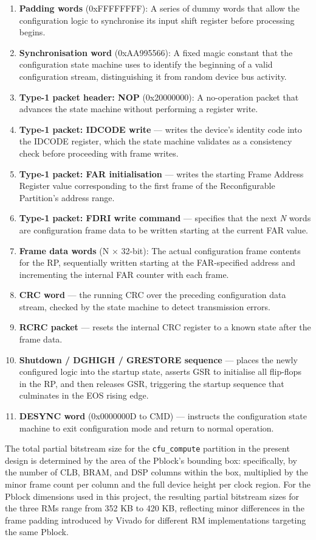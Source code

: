 \begin{enumerate}
  \item \textbf{Padding words} (0xFFFFFFFF): A series of dummy words that allow the configuration logic to synchronise its input shift register before processing begins.
  \item \textbf{Synchronisation word} (0xAA995566): A fixed magic constant that the configuration state machine uses to identify the beginning of a valid configuration stream, distinguishing it from random device bus activity.
  \item \textbf{Type-1 packet header: NOP} (0x20000000): A no-operation packet that advances the state machine without performing a register write.
  \item \textbf{Type-1 packet: IDCODE write} — writes the device's identity code into the IDCODE register, which the state machine validates as a consistency check before proceeding with frame writes.
  \item \textbf{Type-1 packet: FAR initialisation} — writes the starting Frame Address Register value corresponding to the first frame of the Reconfigurable Partition's address range.
  \item \textbf{Type-1 packet: FDRI write command} — specifies that the next \textit{N} words are configuration frame data to be written starting at the current FAR value.
  \item \textbf{Frame data words} (N × 32-bit): The actual configuration frame contents for the RP, sequentially written starting at the FAR-specified address and incrementing the internal FAR counter with each frame.
  \item \textbf{CRC word} — the running CRC over the preceding configuration data stream, checked by the state machine to detect transmission errors.
  \item \textbf{RCRC packet} — resets the internal CRC register to a known state after the frame data.
  \item \textbf{Shutdown / DGHIGH / GRESTORE sequence} — places the newly configured logic into the startup state, asserts GSR to initialise all flip-flops in the RP, and then releases GSR, triggering the startup sequence that culminates in the EOS rising edge.
  \item \textbf{DESYNC word} (0x0000000D to CMD) — instructs the configuration state machine to exit configuration mode and return to normal operation.
\end{enumerate}
The total partial bitstream size for the \texttt{cfu\_compute} partition in the present design is determined by the area of the Pblock's bounding box: specifically, by the number of CLB, BRAM, and DSP columns within the box, multiplied by the minor frame count per column and the full device height per clock region. For the Pblock dimensions used in this project, the resulting partial bitstream sizes for the three RMs range from 352 KB to 420 KB, reflecting minor differences in the frame padding introduced by Vivado for different RM implementations targeting the same Pblock.

